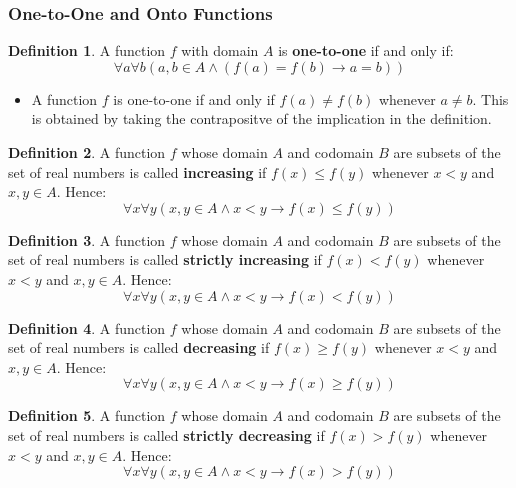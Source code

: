 \documentclass[article, 11pt]{article}
\theoremstyle{definition}
\newtheorem{definition}{Definition}[subsubsection]
\begin{document}
    \subsubsection{One-to-One and Onto Functions}
    \begin{definition}
        A function $f$ with domain $A$ is \textbf{one-to-one} if and only if: 
        \begin{equation*}
            \forall a \forall b (a,b \in A \land (f(a) = f(b) \to a = b))
        \end{equation*}
        \begin{itemize}
            \item A function $f$ is one-to-one if and only if $f(a) \neq f(b)$ whenever $a \neq b$. This is obtained by taking the contrapositve of the implication in the definition.
        \end{itemize}
    \end{definition}
    \begin{definition}
        A function $f$ whose domain $A$ and codomain $B$ are subsets of the set of real numbers is called \textbf{increasing} if $f(x) \leq f(y)$ whenever $x < y$ and $x,y \in A$. Hence:
        \begin{equation*}
            \forall x \forall y (x,y \in A \land x < y \to f(x) \leq f(y))
        \end{equation*}
    \end{definition}
    \begin{definition}
        A function $f$ whose domain $A$ and codomain $B$ are subsets of the set of real numbers is called \textbf{strictly increasing} if $f(x) < f(y)$ whenever $x < y$ and $x,y \in A$. Hence:
        \begin{equation*}
            \forall x \forall y (x,y \in A \land x < y \to f(x) < f(y))
        \end{equation*}
    \end{definition}
    \begin{definition}
        A function $f$ whose domain $A$ and codomain $B$ are subsets of the set of real numbers is called \textbf{decreasing} if $f(x) \geq f(y)$ whenever $x < y$ and $x,y \in A$. Hence:
        \begin{equation*}
            \forall x \forall y (x,y \in A \land x < y \to f(x) \geq f(y))
        \end{equation*}
    \end{definition}
    \begin{definition}
        A function $f$ whose domain $A$ and codomain $B$ are subsets of the set of real numbers is called \textbf{strictly decreasing} if $f(x) > f(y)$ whenever $x < y$ and $x,y \in A$. Hence:
        \begin{equation*}
            \forall x \forall y (x,y \in A \land x < y \to f(x) > f(y))
        \end{equation*}
    \end{definition}
\end{document}

